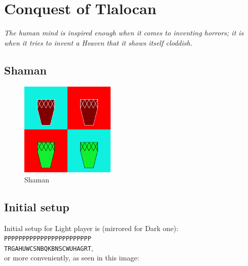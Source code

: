 \documentclass[a5paper,12pt,draft]{book} %
\begin{document}
\clearpage

\chapter*{Conquest of Tlalocan}

\begin{flushright}
\parbox{0.8\textwidth}{
\emph{The human mind is inspired enough when it comes to inventing
horrors; it is when it tries to invent a Heaven that it shows itself
cloddish. \\
 } }
\end{flushright}

\section*{Shaman}

\noindent
\begin{figure}
\includegraphics[width=0.4\textwidth, keepaspectratio=true]{../gfx/pieces/14_shaman.png}
\caption{Shaman}
\label{fig:shaman}
\end{figure}

\clearpage

\section*{Initial setup}

Initial setup for Light player is (mirrored for Dark one):
\texttt{PPPPPPPPPPPPPPPPPPPPPPPP \\
        TRGAHUWCSNBQKBNSCWUHAGRT}, \\
or more conveniently, as seen in this image:
\end{document}
